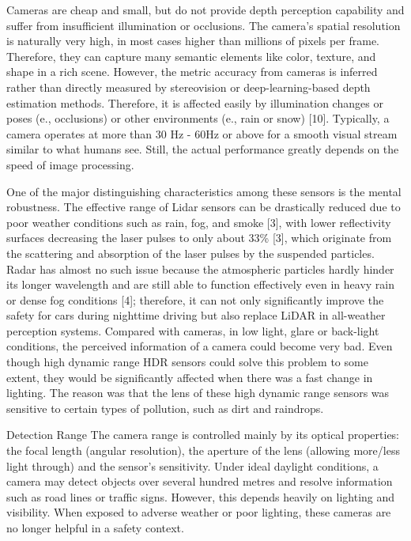 \documentclass[12pt,oneside,bibtotoc,liststotoc]{scrbook}
\begin{document}
Cameras are cheap and small, but do not provide depth perception
capability and suffer from insufficient illumination or occlusions.
The camera's spatial resolution is naturally very high, in most cases higher
than millions of pixels per frame. Therefore, they can capture many semantic elements like color,
texture, and shape in a rich scene. However, the metric accuracy from cameras is inferred rather than
directly measured by stereovision or deep-learning-based depth estimation methods. Therefore, it is
affected easily by illumination changes or poses (e., occlusions) or other environments (e., rain or
snow) [10].
Typically, a camera operates at more than 30 Hz - 60Hz or above for a smooth
visual stream similar to what humans see. Still, the actual performance greatly depends on the speed
of image processing.
\cite{wu2025comparativeAnalysisLiDARRadarCamera}

One of the major distinguishing characteristics among these sensors is the mental robustness. The
effective range of Lidar sensors can be drastically reduced due to poor weather conditions such as
rain, fog, and smoke [3], with lower reflectivity surfaces decreasing the laser pulses to only about
33\% [3], which originate from the scattering and absorption of the laser pulses by the suspended
particles. Radar has almost no such issue because the atmospheric particles hardly hinder its longer
wavelength and are still able to function effectively even in heavy rain or dense fog conditions [4];
therefore, it can not only significantly improve the safety for cars during nighttime driving but also
replace LiDAR in all-weather perception systems. Compared with cameras, in low light, glare or
back-light conditions, the perceived information of a camera could become very bad. Even though
high dynamic range HDR sensors could solve this problem to some extent, they would be
significantly affected when there was a fast change in lighting. The reason was that the lens of these
high dynamic range sensors was sensitive to certain types of pollution, such as dirt and raindrops.
\cite{wu2025comparativeAnalysisLiDARRadarCamera}

Detection Range
The camera range is
controlled mainly by its optical properties: the focal length (angular resolution), the aperture of the
lens (allowing more/less light through) and the sensor's sensitivity. Under ideal daylight conditions,
a camera may detect objects over several hundred metres and resolve information such as road lines
or traffic signs. However, this depends heavily on lighting and visibility. When exposed to adverse
weather or poor lighting, these cameras are no longer helpful in a safety context.
\cite{wu2025comparativeAnalysisLiDARRadarCamera}
\end{document}
